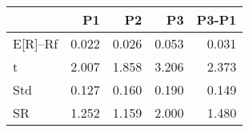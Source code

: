 \begin{tabular}{lrrrr}
\toprule
 & P1 & P2 & P3 & P3-P1 \\
\midrule
E[R]--Rf & 0.022 & 0.026 & 0.053 & 0.031 \\
t & 2.007 & 1.858 & 3.206 & 2.373 \\
Std & 0.127 & 0.160 & 0.190 & 0.149 \\
SR & 1.252 & 1.159 & 2.000 & 1.480 \\
\bottomrule
\end{tabular}
